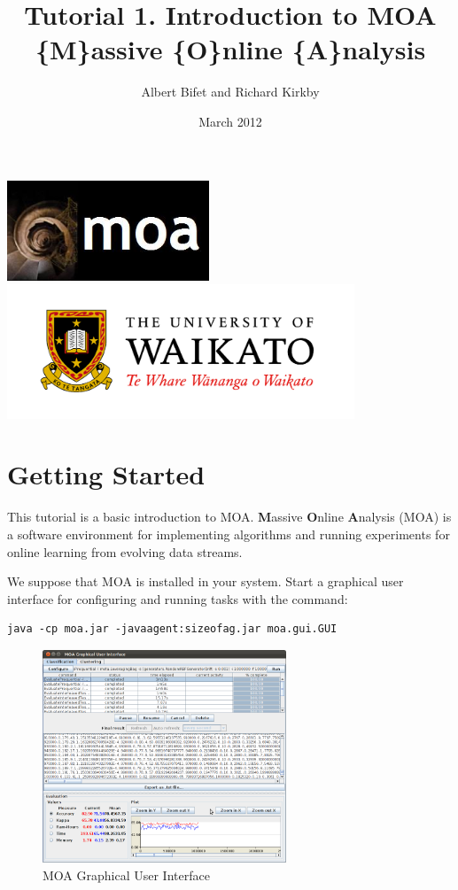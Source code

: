 \documentclass[a4paper,12pt]{article}
\title{Tutorial 1. Introduction to MOA \\ \{M\}assive \{O\}nline \{A\}nalysis}
\author{Albert Bifet and Richard Kirkby}
\date{March 2012}
\begin{document}
\lstset{language=Java,basicstyle=\tiny,numbers=left}
\maketitle
\begin{center}
\includegraphics[height=3cm]{images/LogoMOA.jpg} \\
\includegraphics[height=4cm]{images/Waikato.jpg} \\ 
\end{center}
\thispagestyle{empty}
\newpage
\setcounter{page}{1}

\section{Getting Started}

This tutorial is a basic introduction to MOA.
{\bf M}assive {\bf O}nline {\bf A}nalysis (MOA) is a  
software environment for implementing algorithms and running experiments
for online learning from 
evolving data streams.

We suppose that MOA is installed in your system.
Start a graphical user interface for configuring and running tasks with the command:

\begin{verbatim}
java -cp moa.jar -javaagent:sizeofag.jar moa.gui.GUI
\end{verbatim}

\begin{figure}[h]
\begin{center} 
\includegraphics[height=2.5in]{images/MOA_Task.png}
\end{center} 
\caption{MOA Graphical User Interface}
\label{fig:moagui}
\end{figure}
\end{document}
